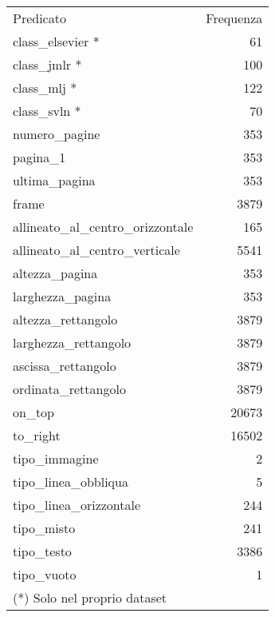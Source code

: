 \begin{table}[h!tbp]
\centering
\label{tab:frequenzaPredicati}
\small\begin{tabular}{lr}
\toprule
\addlinespace
Predicato & Frequenza \\
\addlinespace
\midrule
\addlinespace
class\_elsevier * & 61 \\
class\_jmlr * & 100 \\
class\_mlj * & 122 \\
class\_svln * & 70 \\
numero\_pagine & 353 \\
pagina\_1 & 353 \\
ultima\_pagina & 353 \\
frame & 3879 \\
allineato\_al\_centro\_orizzontale & 165 \\
allineato\_al\_centro\_verticale & 5541 \\
altezza\_pagina & 353 \\
larghezza\_pagina & 353 \\
altezza\_rettangolo & 3879 \\
larghezza\_rettangolo & 3879 \\
ascissa\_rettangolo & 3879 \\
ordinata\_rettangolo & 3879 \\
on\_top & 20673 \\
to\_right & 16502 \\
tipo\_immagine & 2 \\
tipo\_linea\_obbliqua & 5 \\
tipo\_linea\_orizzontale & 244 \\
tipo\_misto & 241 \\
tipo\_testo & 3386 \\
tipo\_vuoto & 1 \\
\addlinespace
\bottomrule
\addlinespace
(*) Solo nel proprio dataset & \\
\end{tabular}
\end{table}




